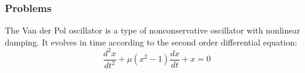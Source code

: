 \documentclass[14pt,compress]{beamer}
\newcounter{time}
\begin{document}
\begin{frame}[fragile]
  \frametitle{Problems}
  The Van der Pol oscillator is a type of nonconservative oscillator with nonlinear damping. It evolves in time according to the second order differential equation:
  \begin{equation*}
  \frac{d^2x}{dt^2}+\mu(x^2-1)\frac{dx}{dt}+x= 0
  \end{equation*}
\end{frame}
\end{document}
